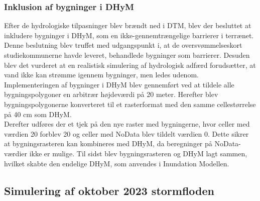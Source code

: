\subsubsection{Inklusion af bygninger i DHyM} \label{Afsnit: Inklusion af bygninger i DHyM}

Efter de hydrologiske tilpasninger blev brændt ned i DTM, blev der besluttet at inkludere bygninger i DHyM, som en ikke-gennemtrængelige barrierer i terrænet. Denne beslutning blev truffet med udgangspunkt i, at de oversvømmelseskort studiekommunerne havde leveret, behandlede bygninger som barrierer. Desuden blev det vurderet at en realistisk simulering af hydrologisk adfærd forudsætter, at vand ikke kan strømme igennem bygninger, men ledes udenom. \\

Implementeringen af bygninger i DHyM blev gennemført ved at tildele alle bygningspolygoner en arbitrær højdeværdi på 20 meter. Herefter blev bygningspolygonerne konverteret til et rasterformat med den samme cellestørrelse på 40 cm som DHyM. \\
Derefter udføres der et tjek på den nye raster med bygningerne, hvor celler med værdien 20 forblev 20 og celler med NoData blev tildelt værdien 0. Dette sikrer at bygningsrasteren kan kombineres med DHyM, da beregninger på NoData-værdier ikke er mulige. Til sidst blev bygningsrasteren og DHyM lagt sammen, hvilket skabte den endelige DHyM, som anvendes i Inundation Modellen.


\subsection{Simulering af oktober 2023 stormfloden}\label{Afsnit: Simulering af stormflod 2023}


